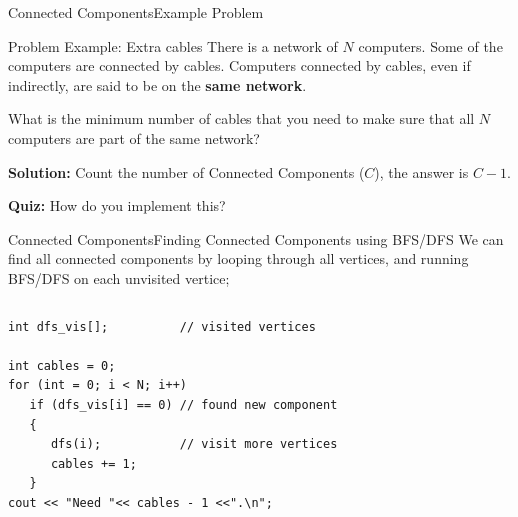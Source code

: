 \begin{frame}{Connected Components}{Example Problem}
  \begin{block}{Problem Example: Extra cables}
    There is a network of $N$ computers. Some of the computers are connected by cables. Computers connected by cables, even if indirectly, are said to be on the {\bf same network}.
    \bigskip

    What is the minimum number of cables that you need to make sure that all $N$ computers are part of the same network?
  \end{block}\bigskip

  {\bf Solution:} Count the number of Connected Components ($C$), the answer is $C-1$.\bigskip

  {\bf Quiz:} How do you implement this?
\end{frame}

\begin{frame}[fragile]{Connected Components}{Finding Connected Components using BFS/DFS}
  We can find all connected components by looping through all vertices, and running BFS/DFS on each unvisited vertice;

\begin{columns}
  \begin{exampleblock}{}
\begin{verbatim}
int dfs_vis[];          // visited vertices

int cables = 0;
for (int = 0; i < N; i++)
   if (dfs_vis[i] == 0) // found new component
   {
      dfs(i);           // visit more vertices
      cables += 1;
   }
cout << "Need "<< cables - 1 <<".\n";
\end{verbatim}
  \end{exampleblock}
  \begin{center}
\end{center}
\end{columns}

\end{frame}

%
%
%

